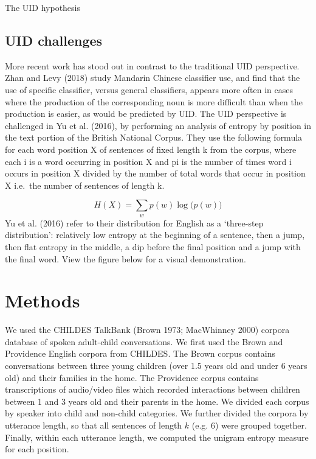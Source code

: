 \documentclass[10pt, letterpaper]{article}
\begin{document}
The UID hypothesis

\subsection{UID challenges}\label{uid-challenges}

More recent work has stood out in contrast to the traditional UID
perspective. Zhan and Levy (2018) study Mandarin Chinese classifier use,
and find that the use of specific classifier, versus general
classifiers, appears more often in cases where the production of the
corresponding noun is more difficult than when the production is easier,
as would be predicted by UID. The UID perspective is challenged in Yu et
al. (2016), by performing an analysis of entropy by position in the text
portion of the British National Corpus. They use the following formula
for each word position X of sentences of fixed length k from the corpus,
where each i is a word occurring in position X and pi is the number of
times word i occurs in position X divided by the number of total words
that occur in position X i.e.~the number of sentences of length k.

\[H(X) = \sum\limits_w p(w)\log\big(p(w)\big)\] Yu et al. (2016) refer
to their distribution for English as a `three-step distribution':
relatively low entropy at the beginning of a sentence, then a jump, then
flat entropy in the middle, a dip before the final position and a jump
with the final word. View the figure below for a visual demonstration.

\section{Methods}\label{methods}

We used the CHILDES TalkBank (Brown 1973; MacWhinney 2000) corpora
database of spoken adult-child conversations. We first used the Brown
and Providence English corpora from CHILDES. The Brown corpus contains
conversations between three young children (over 1.5 years old and under
6 years old) and their families in the home. The Providence corpus
contains transcriptions of audio/video files which recorded interactions
between children between 1 and 3 years old and their parents in the
home. We divided each corpus by speaker into child and non-child
categories. We further divided the corpora by utterance length, so that
all sentences of length \(k\) (e.g. \(6\)) were grouped together.
Finally, within each utterance length, we computed the unigram entropy
measure for each position.
\end{document}
